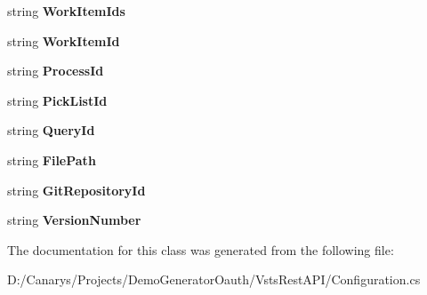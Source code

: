 \begin{DoxyCompactItemize}
\item 
\mbox{\label{class_vsts_rest_a_p_i_1_1_configuration_ae8227b87080c760e3b4d81ef746121d7}} 
string {\bfseries Work\+Item\+Ids}
\item 
\mbox{\label{class_vsts_rest_a_p_i_1_1_configuration_a6a318c11c19bb1f57bc00c6cc0e12f4e}} 
string {\bfseries Work\+Item\+Id}
\item 
\mbox{\label{class_vsts_rest_a_p_i_1_1_configuration_a53a7cac1a429b2aa4bfaa04a08840318}} 
string {\bfseries Process\+Id}
\item 
\mbox{\label{class_vsts_rest_a_p_i_1_1_configuration_ad12123a7877f666299ea72e3f234a436}} 
string {\bfseries Pick\+List\+Id}
\item 
\mbox{\label{class_vsts_rest_a_p_i_1_1_configuration_aecc0b78e15cfb0f61fd3699bad83211a}} 
string {\bfseries Query\+Id}
\item 
\mbox{\label{class_vsts_rest_a_p_i_1_1_configuration_afd73ff022d8969e254d375ced75db832}} 
string {\bfseries File\+Path}
\item 
\mbox{\label{class_vsts_rest_a_p_i_1_1_configuration_ae9e3abdb70d02de16b5cd44e25875452}} 
string {\bfseries Git\+Repository\+Id}
\item 
\mbox{\label{class_vsts_rest_a_p_i_1_1_configuration_a21235089b15bff042218bd3bd143b705}} 
string {\bfseries Version\+Number}
\end{DoxyCompactItemize}


The documentation for this class was generated from the following file\+:\begin{DoxyCompactItemize}
\item 
D\+:/\+Canarys/\+Projects/\+Demo\+Generator\+Oauth/\+Vsts\+Rest\+A\+P\+I/Configuration.\+cs\end{DoxyCompactItemize}
